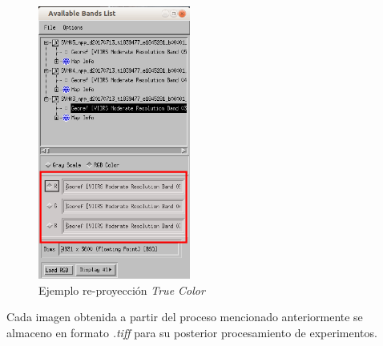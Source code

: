 \begin{enumerate}
\begin{figure}[H]
 \centering
  \includegraphics[height=9cm,keepaspectratio=true,clip=true]{imagenes/RecolecciondeDatos/envi3.png}
  \caption{Ejemplo re-proyección \textit{True Color}}
	\label{Fig: envi3}
\end{figure}

\end{enumerate}


Cada imagen obtenida a partir del proceso mencionado anteriormente se almaceno en formato \textit{.tiff} para su posterior procesamiento de experimentos.